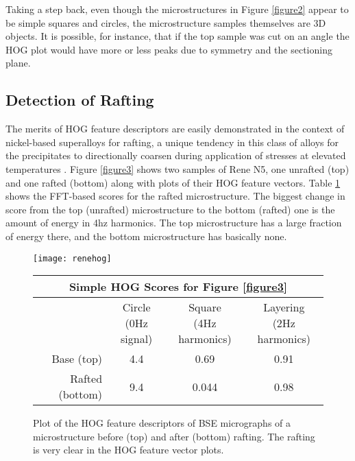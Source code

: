 \documentclass[review]{elsarticle}
\begin{document}
	Taking a step back, even though the microstructures in Figure \ref{figure2} appear to be simple squares and circles, the microstructure samples themselves are 3D objects. It is possible, for instance, that if the top sample was cut on an angle the HOG plot would have more or less peaks due to symmetry and the sectioning plane.
	 
	\subsection{Detection of Rafting}
	The merits of HOG feature descriptors are easily demonstrated in the context of nickel-based superalloys for rafting, a unique tendency in this class of alloys for the precipitates to directionally coarsen during application of stresses at elevated temperatures \cite{pollock2006}. Figure \ref{figure3} shows two samples of Rene N5, one unrafted (top) and one rafted (bottom) along with plots of their HOG feature vectors. Table \ref{table2} shows the FFT-based scores for the rafted microstructure. The biggest change in score from the top (unrafted) microstructure to the bottom (rafted) one is the amount of energy in 4hz harmonics. The top microstructure has a large fraction of energy there, and the bottom microstructure has basically none.
	
	\begin{figure}[!ht]
		\begin{center}
			\texttt{[image: renehog]}
	  		\caption{ Plot of the HOG feature descriptors of BSE micrographs of a microstructure before (top) and after (bottom) rafting. The rafting is very clear in the HOG feature vector plots. }
	  		\label{figure3}
  		
			\begin{tabular}{ r | c | c | c }
				\multicolumn{4}{c}{\textbf{Simple HOG Scores for Figure \ref{figure3}}} \\
				\hline
				& \shortstack{Circle \\ (0Hz signal)} & \shortstack{Square \\ (4Hz harmonics)} & \shortstack{Layering \\ (2Hz harmonics)} \\
				\hline
				Base (top) & 4.4 & 0.69 & 0.91 \\
				Rafted (bottom) & 9.4 & 0.044 & 0.98 \\
				\hline
			\end{tabular}
			
	  		\label{table2}
		\end{center}
	\end{figure}
\end{document}
